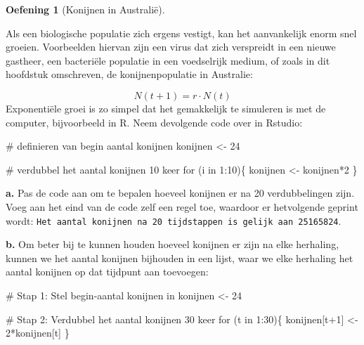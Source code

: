 \documentclass[
  a4paper,
]{scrbook}
\newenvironment{Shaded}{\begin{snugshade}}{\end{snugshade}}
\newcommand{\CommentTok}[1]{\textcolor[rgb]{0.37,0.37,0.37}{#1}}
\newcommand{\ControlFlowTok}[1]{\textcolor[rgb]{0.00,0.23,0.31}{#1}}
\newcommand{\DecValTok}[1]{\textcolor[rgb]{0.68,0.00,0.00}{#1}}
\newcommand{\NormalTok}[1]{\textcolor[rgb]{0.00,0.23,0.31}{#1}}
\newcommand{\OtherTok}[1]{\textcolor[rgb]{0.00,0.23,0.31}{#1}}
\newcommand{\SpecialCharTok}[1]{\textcolor[rgb]{0.37,0.37,0.37}{#1}}
\theoremstyle{definition}
\newtheorem{exercise}{Oefening}[chapter]
\theoremstyle{remark}
\begin{document}
\begin{exercise}[Konijnen in
Australië]\protect\hypertarget{exr-rabbits-map}{}\label{exr-rabbits-map}

Als een biologische populatie zich ergens vestigt, kan het aanvankelijk
enorm snel groeien. Voorbeelden hiervan zijn een virus dat zich
verspreidt in een nieuwe gastheer, een bacteriële populatie in een
voedselrijk medium, of zoals in dit hoofdstuk omschreven, de
konijnenpopulatie in Australie:

\[
N(t+1) = r \cdot N(t) 
\] Exponentiële groei is zo simpel dat het gemakkelijk te simuleren is
met de computer, bijvoorbeeld in R. Neem devolgende code over in
Rstudio:

\begin{Shaded}
\begin{Highlighting}[]
\CommentTok{\# definieren van begin aantal konijnen}
\NormalTok{konijnen }\OtherTok{\textless{}{-}} \DecValTok{24}

\CommentTok{\# verdubbel het aantal konijnen 10 keer}
\ControlFlowTok{for}\NormalTok{ (i }\ControlFlowTok{in} \DecValTok{1}\SpecialCharTok{:}\DecValTok{10}\NormalTok{)\{}
\NormalTok{    konijnen }\OtherTok{\textless{}{-}}\NormalTok{ konijnen}\SpecialCharTok{*}\DecValTok{2}
\NormalTok{\}}
\end{Highlighting}
\end{Shaded}

\textbf{a.} Pas de code aan om te bepalen hoeveel konijnen er na 20
verdubbelingen zijn. Voeg aan het eind van de code zelf een regel toe,
waardoor er hetvolgende geprint wordt:
\texttt{Het\ aantal\ konijnen\ na\ 20\ tijdstappen\ is\ gelijk\ aan\ 25165824}.

\textbf{b.} Om beter bij te kunnen houden hoeveel konijnen er zijn na
elke herhaling, kunnen we het aantal konijnen bijhouden in een lijst,
waar we elke herhaling het aantal konijnen op dat tijdpunt aan
toevoegen:

\begin{Shaded}
\begin{Highlighting}[]
\CommentTok{\# Stap 1: Stel begin{-}aantal konijnen in}
\NormalTok{konijnen }\OtherTok{\textless{}{-}} \DecValTok{24}

\CommentTok{\# Stap 2: Verdubbel het aantal konijnen 30 keer}
\ControlFlowTok{for}\NormalTok{ (t }\ControlFlowTok{in} \DecValTok{1}\SpecialCharTok{:}\DecValTok{30}\NormalTok{)\{}
\NormalTok{  konijnen[t}\SpecialCharTok{+}\DecValTok{1}\NormalTok{] }\OtherTok{\textless{}{-}} \DecValTok{2}\SpecialCharTok{*}\NormalTok{konijnen[t]}
\NormalTok{\}}


\end{Highlighting}
\end{Shaded}
\end{exercise}
\end{document}
